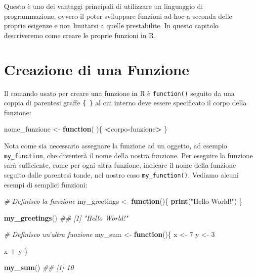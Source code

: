 \documentclass[
]{book}
\newenvironment{Shaded}{\begin{snugshade}}{\end{snugshade}}
\newcommand{\CommentTok}[1]{\textcolor[rgb]{0.56,0.35,0.01}{\textit{#1}}}
\newcommand{\ControlFlowTok}[1]{\textcolor[rgb]{0.13,0.29,0.53}{\textbf{#1}}}
\newcommand{\DecValTok}[1]{\textcolor[rgb]{0.00,0.00,0.81}{#1}}
\newcommand{\KeywordTok}[1]{\textcolor[rgb]{0.13,0.29,0.53}{\textbf{#1}}}
\newcommand{\NormalTok}[1]{#1}
\newcommand{\OperatorTok}[1]{\textcolor[rgb]{0.81,0.36,0.00}{\textbf{#1}}}
\newcommand{\StringTok}[1]{\textcolor[rgb]{0.31,0.60,0.02}{#1}}
\begin{document}
Questo è uno dei vantaggi principali di utilizzare un linguaggio di programmazione, ovvero il poter sviluppare funzioni ad-hoc a seconda delle proprie esigenze e non limitarsi a quelle prestabilite. In questo capitolo descriveremo come creare le proprie funzioni in R.

\hypertarget{creazione-di-una-funzione}{%
\section{Creazione di una Funzione}\label{creazione-di-una-funzione}}

Il comando usato per creare una funzione in R è \texttt{function()} seguito da una coppia di parentesi graffe \texttt{\{\ \}} al cui interno deve essere specificato il corpo della funzione:

\begin{Shaded}
\begin{Highlighting}[]
\NormalTok{nome_funzione <-}\StringTok{ }\ControlFlowTok{function}\NormalTok{( )\{}
  \OperatorTok{<}\NormalTok{corpo}\OperatorTok{-}\NormalTok{funzione}\OperatorTok{>}
\NormalTok{\}}
\end{Highlighting}
\end{Shaded}

Nota come sia necessario assegnare la funzione ad un oggetto, ad esempio \texttt{my\_function}, che diventerà il nome della nostra funzione. Per eseguire la funzione sarà sufficiente, come per ogni altra funzione, indicare il nome della funzione seguito dalle parentesi tonde, nel nostro caso \texttt{my\_function()}. Vediamo alcuni esempi di semplici funzioni:

\begin{Shaded}
\begin{Highlighting}[]
\CommentTok{# Definisco la funzione}
\NormalTok{my_greetings <-}\StringTok{ }\ControlFlowTok{function}\NormalTok{()\{}
  \KeywordTok{print}\NormalTok{(}\StringTok{"Hello World!"}\NormalTok{)}
\NormalTok{\}}

\KeywordTok{my_greetings}\NormalTok{()}
\CommentTok{## [1] "Hello World!"}

\CommentTok{# Definisco un'altra funzione}
\NormalTok{my_sum <-}\StringTok{ }\ControlFlowTok{function}\NormalTok{()\{}
\NormalTok{  x <-}\StringTok{ }\DecValTok{7}
\NormalTok{  y <-}\StringTok{ }\DecValTok{3}
  
\NormalTok{  x }\OperatorTok{+}\StringTok{ }\NormalTok{y}
\NormalTok{\}}

\KeywordTok{my_sum}\NormalTok{()}
\CommentTok{## [1] 10}
\end{Highlighting}
\end{Shaded}
\end{document}

